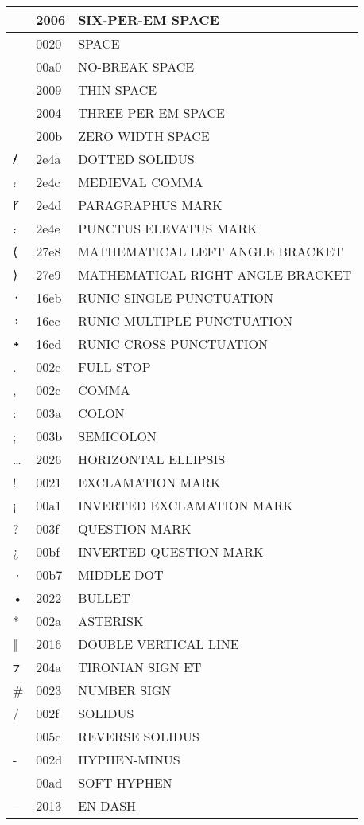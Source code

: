 \documentclass[12pt,letterpaper,openany]{book}
\begin{document}
\begin{center}
\begin{supertabular}{|m{0.25in}|m{0.5in}|m{4in}|}
  & 2006 & SIX-PER-EM SPACE\\\hline
  & 0020 & SPACE\\\hline
  & 00a0 & NO-BREAK SPACE\\\hline
  & 2009 & THIN SPACE\\\hline
  & 2004 & THREE-PER-EM SPACE\\\hline
​ & 200b & ZERO WIDTH SPACE\\\hline
⹊ & 2e4a & DOTTED SOLIDUS\\\hline
⹌ & 2e4c & MEDIEVAL COMMA\\\hline
⹍ & 2e4d & PARAGRAPHUS MARK\\\hline
⹎ & 2e4e & PUNCTUS ELEVATUS MARK\\\hline
⟨ & 27e8 & MATHEMATICAL LEFT ANGLE BRACKET\\\hline
⟩ & 27e9 & MATHEMATICAL RIGHT ANGLE BRACKET\\\hline
᛫ & 16eb & RUNIC SINGLE PUNCTUATION\\\hline
᛬ & 16ec & RUNIC MULTIPLE PUNCTUATION\\\hline
᛭ & 16ed & RUNIC CROSS PUNCTUATION\\\hline
. & 002e & FULL STOP\\\hline
, & 002c & COMMA\\\hline
: & 003a & COLON\\\hline
; & 003b & SEMICOLON\\\hline
… & 2026 & HORIZONTAL ELLIPSIS\\\hline
! & 0021 & EXCLAMATION MARK\\\hline
¡ & 00a1 & INVERTED EXCLAMATION MARK\\\hline
? & 003f & QUESTION MARK\\\hline
¿ & 00bf & INVERTED QUESTION MARK\\\hline
· & 00b7 & MIDDLE DOT\\\hline
• & 2022 & BULLET\\\hline
* & 002a & ASTERISK\\\hline
‖ & 2016 & DOUBLE VERTICAL LINE\\\hline
⁊ & 204a & TIRONIAN SIGN ET\\\hline
\# & 0023 & NUMBER SIGN\\\hline
/ & 002f & SOLIDUS\\\hline
\ & 005c & REVERSE SOLIDUS\\\hline
- & 002d & HYPHEN-MINUS\\\hline
­ & 00ad & SOFT HYPHEN\\\hline
– & 2013 & EN DASH\\\hline

\end{supertabular}
\end{center}
\end{document}
